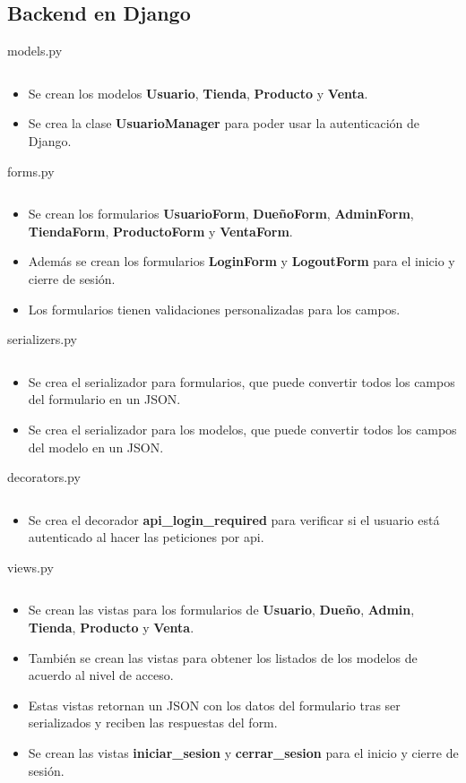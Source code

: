 \documentclass{article}
\newenvironment{block}{\captionsetup{type=listing}}{}
\begin{document}
\subsection{Backend en Django}
\begin{block}
	\caption{models.py}
	\inputminted[breaklines]{Python}{kioskios_api/api/models.py}
	\begin{itemize}
		\item Se crean los modelos \textbf{Usuario}, \textbf{Tienda}, \textbf{Producto} y \textbf{Venta}.
		\item Se crea la clase \textbf{UsuarioManager} para poder usar la autenticación de Django.
	\end{itemize}

	\caption{forms.py}
	\inputminted{Python}{kioskios_api/api/forms.py}
	\begin{itemize}
		\item Se crean los formularios \textbf{UsuarioForm}, \textbf{DueñoForm}, \textbf{AdminForm}, \textbf{TiendaForm}, \textbf{ProductoForm} y \textbf{VentaForm}.
		\item Además se crean los formularios \textbf{LoginForm} y \textbf{LogoutForm} para el inicio y cierre de sesión.
		\item Los formularios tienen validaciones personalizadas para los campos.
	\end{itemize}

	\caption{serializers.py}
	\inputminted[breaklines]{Python}{kioskios_api/api/serializers.py}
	\begin{itemize}
		\item Se crea el serializador para formularios, que puede convertir todos los campos del formulario en un JSON.
		\item Se crea el serializador para los modelos, que puede convertir todos los campos del modelo en un JSON.
	\end{itemize}

	\caption{decorators.py}
	\inputminted{Python}{kioskios_api/api/decorators.py}
	\begin{itemize}
		\item Se crea el decorador \textbf{api\_login\_required} para verificar si el usuario está autenticado al hacer las peticiones por api.
	\end{itemize}

	\caption{views.py}
	\inputminted[breaklines]{Python}{kioskios_api/api/views.py}
	\begin{itemize}
		\item Se crean las vistas para los formularios de \textbf{Usuario}, \textbf{Dueño}, \textbf{Admin}, \textbf{Tienda}, \textbf{Producto} y \textbf{Venta}.
		\item También se crean las vistas para obtener los listados de los modelos de acuerdo al nivel de acceso.
		\item Estas vistas retornan un JSON con los datos del formulario tras ser serializados y reciben las respuestas del form.
		\item Se crean las vistas \textbf{iniciar\_sesion} y \textbf{cerrar\_sesion} para el inicio y cierre de sesión.
	\end{itemize}


\end{block}
\end{document}
